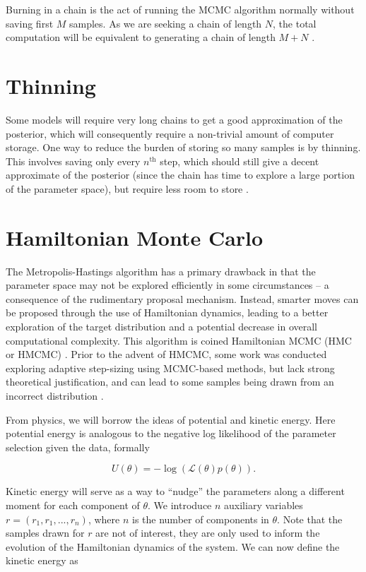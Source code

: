     Burning in a chain is the act of running the MCMC algorithm normally without saving first $M$ samples. As we are seeking a chain of length $N$, the total computation will be equivalent to generating a chain of length $M+N$ \cite{Andrieu2003}.


\section{Thinning}

    Some models will require very long chains to get a good approximation of the posterior, which will consequently require a non-trivial amount of computer storage. One way to reduce the burden of storing so many samples is by thinning. This involves saving only every $n^{\text{th}}$ step, which should still give a decent approximate of the posterior (since the chain has time to explore a large portion of the parameter space), but require less room to store \cite{Link2012}.


\section{Hamiltonian Monte Carlo}

    The Metropolis-Hastings algorithm has a primary drawback in that the parameter space may not be explored efficiently in some circumstances -- a consequence of the rudimentary proposal mechanism. Instead, smarter moves can be proposed through the use of Hamiltonian dynamics, leading to a better exploration of the target distribution and a potential decrease in overall computational complexity. This algorithm is coined Hamiltonian MCMC (HMC or HMCMC) \cite{Neal2011}. Prior to the advent of HMCMC, some work was conducted exploring adaptive step-sizing using MCMC-based methods, but lack strong theoretical justification, and can lead to some samples being drawn from an incorrect distribution \cite{Neal2011}.

    From physics, we will borrow the ideas of potential and kinetic energy. Here potential energy is analogous to the negative log likelihood of the parameter selection given the data, formally

    \begin{equation}
        U(\theta) = -\log(\mathcal{L}(\theta)p(\theta)).
    \end{equation}

    Kinetic energy will serve as a way to ``nudge'' the parameters along a different moment for each component of $\theta$. We introduce $n$ auxiliary variables $r = (r_1, r_1,...,r_n)$, where $n$ is the number of components in $\theta$. Note that the samples drawn for $r$ are not of interest, they are only used to inform the evolution of the Hamiltonian dynamics of the system. We can now define the kinetic energy as

